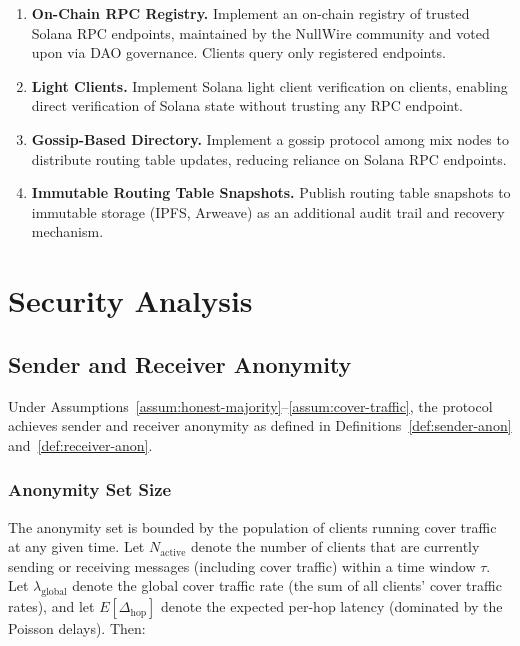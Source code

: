 \documentclass[11pt]{article}
\theoremstyle{definition}
\theoremstyle{remark}
\begin{document}
\begin{enumerate}
    \item \textbf{On-Chain RPC Registry.} Implement an on-chain registry of trusted Solana RPC endpoints, maintained by the NullWire community and voted upon via DAO governance. Clients query only registered endpoints.

    \item \textbf{Light Clients.} Implement Solana light client verification on clients, enabling direct verification of Solana state without trusting any RPC endpoint.

    \item \textbf{Gossip-Based Directory.} Implement a gossip protocol among mix nodes to distribute routing table updates, reducing reliance on Solana RPC endpoints.

    \item \textbf{Immutable Routing Table Snapshots.} Publish routing table snapshots to immutable storage (IPFS, Arweave) as an additional audit trail and recovery mechanism.
\end{enumerate}

\section{Security Analysis}
\label{sec:security}

\subsection{Sender and Receiver Anonymity}
\label{subsec:sender-recv-anon}

Under Assumptions~\ref{assum:honest-majority}--\ref{assum:cover-traffic}, the protocol achieves sender and receiver anonymity as defined in Definitions~\ref{def:sender-anon} and~\ref{def:receiver-anon}.

\subsubsection{Anonymity Set Size}

The anonymity set is bounded by the population of clients running cover traffic at any given time. Let $N_{\text{active}}$ denote the number of clients that are currently sending or receiving messages (including cover traffic) within a time window $\tau$. Let $\lambda_{\text{global}}$ denote the global cover traffic rate (the sum of all clients' cover traffic rates), and let $E[\Delta_{\text{hop}}]$ denote the expected per-hop latency (dominated by the Poisson delays). Then:
\end{document}
